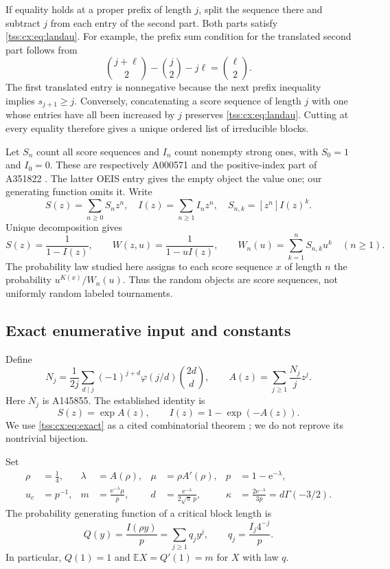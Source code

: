 \documentclass[11pt]{article}
\theoremstyle{remark}\newtheorem{remark}[theorem]{Remark}
\theoremstyle{definition}\newtheorem{definition}[theorem]{Definition}
\newcommand{\e}{\mathrm e}
\newcommand{\E}{\mathbb E}
\begin{document}
If equality holds at a proper prefix of length $j$, split the sequence
there and subtract $j$ from each entry of the second part. Both parts
satisfy \eqref{tss:cx:eq:landau}. For example, the prefix sum condition for
the translated second part follows from
\[
 \binom{j+\ell}{2}-\binom j2-j\ell=\binom\ell2.
\]
The first translated entry is nonnegative because the next prefix
inequality implies $s_{j+1}\ge j$. Conversely, concatenating a score
sequence of length $j$ with one whose entries have all been increased
by $j$ preserves \eqref{tss:cx:eq:landau}. Cutting at every equality therefore
gives a unique ordered list of irreducible blocks.

Let $S_n$ count all score sequences and $I_n$ count nonempty strong
ones, with $S_0=1$ and $I_0=0$. These are respectively A000571 and the
positive-index part of A351822 \cite{OEIS}. The latter OEIS entry gives
the empty object the value one; our generating function omits it.
Write
\[
 S(z)=\sum_{n\ge0}S_nz^n,\quad
 I(z)=\sum_{n\ge1}I_nz^n,\quad
 S_{n,k}=[z^n]I(z)^k.
\]
Unique decomposition gives
\begin{equation}\label{tss:cx:eq:weighted}
 S(z)=\frac1{1-I(z)},\qquad
 W(z,u)=\frac1{1-uI(z)},\qquad
 W_n(u)=\sum_{k=1}^n S_{n,k}u^k\quad(n\ge1).
\end{equation}
The probability law studied here assigns to each score sequence $x$
of length $n$ the probability $u^{K(x)}/W_n(u)$. Thus the random objects
are score sequences, not uniformly random labeled tournaments.

\subsection{Exact enumerative input and constants}
Define
\begin{equation}\label{tss:cx:eq:A}
 N_j=\frac1{2j}\sum_{d\mid j}(-1)^{j+d}\varphi(j/d)\binom{2d}{d},
 \qquad A(z)=\sum_{j\ge1}\frac{N_j}{j}z^j.
\end{equation}
Here $N_j$ is A145855. The established identity is
\begin{equation}\label{tss:cx:eq:exact}
 S(z)=\exp A(z),\qquad I(z)=1-\exp(-A(z)).
\end{equation}
We use \eqref{tss:cx:eq:exact} as a cited combinatorial theorem
\cite{CDFS,BDK}; we do not reprove its nontrivial bijection.

Set
\begin{align}
 \rho&=\tfrac14,& \lambda&=A(\rho),& \mu&=\rho A'(\rho),
 &p&=1-\e^{-\lambda},\label{tss:cx:eq:constants1}\\
 u_c&=p^{-1},& m&=\frac{\e^{-\lambda}\mu}{p},&
 d&=\frac{\e^{-\lambda}}{2\sqrt\pi\,p},&
 \kappa&=\frac{2\e^{-\lambda}}{3p}
       =d\Gamma(-3/2).\label{tss:cx:eq:constants2}
\end{align}
The probability generating function of a critical block length is
\begin{equation}\label{tss:cx:eq:Q}
 Q(y)=\frac{I(\rho y)}p=\sum_{j\ge1}q_jy^j,
 \qquad q_j=\frac{I_j4^{-j}}p.
\end{equation}
In particular, $Q(1)=1$ and $\E X=Q'(1)=m$ for $X$ with law $q$.
\end{document}
